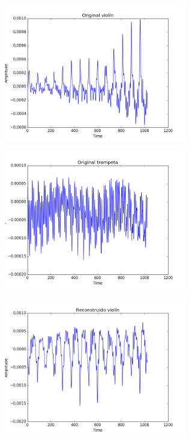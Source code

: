 \begin{figure}[h]
    \begin{subfigure}{0.5\textwidth}
        \centering
        \includegraphics[height=60mm]{Content/Figures/orig_vio.png}
    \end{subfigure}
    \begin{subfigure}{0.5\textwidth}
        \centering
        \includegraphics[height=60mm]{Content/Figures/orig_tromp.png}
    \end{subfigure}
\newline
    \begin{subfigure}{.5\textwidth}
        \centering
        \includegraphics[height=60mm]{Content/Figures/recons_vio.png}
    \end{subfigure}
    \begin{subfigure}{.5\textwidth}

\end{subfigure}
\end{figure}
